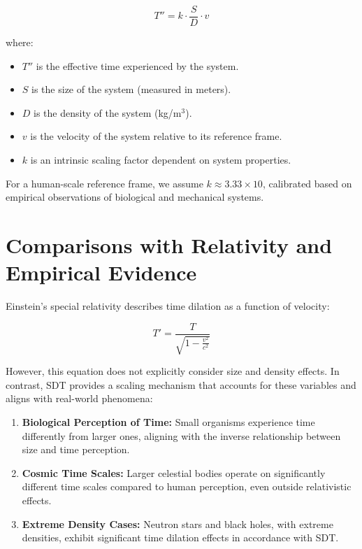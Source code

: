 \documentclass[aps,prl,twocolumn,superscriptaddress]{revtex4-2}
\begin{document}
\begin{equation}
    T'' = k \cdot \frac{S}{D} \cdot v
\end{equation}

where:
\begin{itemize}
    \item $T''$ is the effective time experienced by the system.
    \item $S$ is the size of the system (measured in meters).
    \item $D$ is the density of the system (kg/m$^3$).
    \item $v$ is the velocity of the system relative to its reference frame.
    \item $k$ is an intrinsic scaling factor dependent on system properties.
\end{itemize}

For a human-scale reference frame, we assume $k \approx 3.33 \times 10$, calibrated based on empirical observations of biological and mechanical systems.

\section{Comparisons with Relativity and Empirical Evidence}
Einstein’s special relativity describes time dilation as a function of velocity:

\begin{equation}
    T' = \frac{T}{\sqrt{1 - \frac{v^2}{c^2}}}
\end{equation}

However, this equation does not explicitly consider size and density effects. In contrast, SDT provides a scaling mechanism that accounts for these variables and aligns with real-world phenomena:

\begin{enumerate}
    \item \textbf{Biological Perception of Time:} Small organisms experience time differently from larger ones, aligning with the inverse relationship between size and time perception.
    \item \textbf{Cosmic Time Scales:} Larger celestial bodies operate on significantly different time scales compared to human perception, even outside relativistic effects.
    \item \textbf{Extreme Density Cases:} Neutron stars and black holes, with extreme densities, exhibit significant time dilation effects in accordance with SDT.
\end{enumerate}
\end{document}
